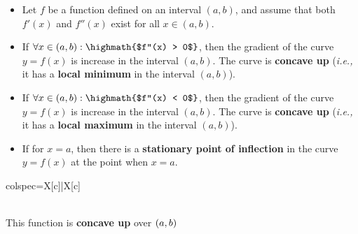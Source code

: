 \documentclass[12pt,a4paper,titlepage]{article}
\DeclarePairedDelimiter {\pars}  {  (      }     {  )      }
\begin{document}
            \begin{SummaryBox}[title=Second derivative of a function (concavity), leftlower=0pt, rightlower=0pt]
                \begin{itemize}[leftmargin=*]
                    \item Let $f$ be a function defined on an interval $(a,b)$, and assume that both $f'(x)$ and $f''(x)$ exist for all $x \in (a,b)$.
                    \item If $\forall x \in (a,b): \highmath{$f''(x) > 0$}$, then the gradient of the curve $y=f(x)$ is increase in the interval $(a,b)$. The curve is \textbf{concave up} (\textit{i.e.,} it has a \textbf{local minimum} in the interval $(a,b)$).
                    \item If $\forall x \in (a,b): \highmath{$f''(x) < 0$}$, then the gradient of the curve $y=f(x)$ is increase in the interval $(a,b)$. The curve is \textbf{concave up} (\textit{i.e.,} it has a \textbf{local maximum} in the interval $(a,b)$).
                    \item If  for $x=a$, then there is a \textbf{stationary point of inflection} in the curve $y=f(x)$ at the point when $x=a$.
                \end{itemize}
                \tcblower
                \begin{tblr}{colspec={X[c]|X[c]}}
                    {\\
                    This function is \textbf{concave up} over $\pars*{a, b}$}
                    

\end{tblr}
\end{SummaryBox}
\end{document}
